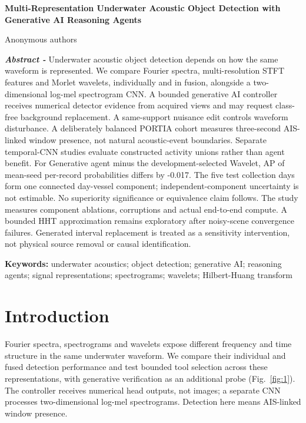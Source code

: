 \documentclass[11pt,letterpaper]{article}
\newcommand{\drafttitle}[1]{\begin{center}\sffamily\bfseries\fontsize{16}{19}\selectfont #1\end{center}}
\begin{document}
\fontsize{11}{13}\selectfont

\nocite{portia,signals1,signals2,uabench,physicsgen,huang1998,flowmatching,qwen,waveletship,uniqueship,speechocean,wav2vec2}

\drafttitle{Multi-Representation Underwater Acoustic Object Detection with Generative AI Reasoning Agents}

\begin{center}Anonymous authors\end{center}

{\fontsize{10}{11.5}\selectfont\noindent \textbf{\textit{Abstract - }}Underwater acoustic object detection depends on how the same waveform is represented. We compare Fourier spectra, multi-resolution STFT features and Morlet wavelets, individually and in fusion, alongside a two-dimensional log-mel spectrogram CNN. A bounded generative AI controller receives numerical detector evidence from acquired views and may request class-free background replacement. A same-support nuisance edit controls waveform disturbance. A deliberately balanced PORTIA cohort measures three-second AIS-linked window presence, not natural acoustic-event boundaries. Separate temporal-CNN studies evaluate constructed activity unions rather than agent benefit. For Generative agent minus the development-selected Wavelet, AP of mean-seed per-record probabilities differs by -0.017. The five test collection days form one connected day-vessel component; independent-component uncertainty is not estimable. No superiority significance or equivalence claim follows.  The study measures component ablations, corruptions and actual end-to-end compute. A bounded HHT approximation remains exploratory after noisy-scene convergence failures. Generated interval replacement is treated as a sensitivity intervention, not physical source removal or causal identification.\par}

{\fontsize{9}{11}\selectfont\noindent \textbf{Keywords:} underwater acoustics; object detection; generative AI; reasoning agents; signal representations; spectrograms; wavelets; Hilbert-Huang transform\par}

\section{Introduction}

Fourier spectra, spectrograms and wavelets expose different frequency and time structure in the same underwater waveform. We compare their individual and fused detection performance and test bounded tool selection across these representations, with generative verification as an additional probe (Fig.~\ref{fig:1}). The controller receives numerical head outputs, not images; a separate CNN processes two-dimensional log-mel spectrograms. Detection here means AIS-linked window presence.\par
\end{document}
